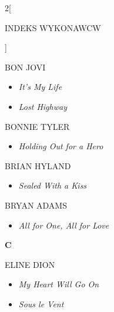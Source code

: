 \documentclass[a4paper]{report}
\begin{document}
\begin{multicols*}{2}[\begin{Huge}INDEKS WYKONAWCW\end{Huge}\vspace{1cm}]
\begin{minipage}{\columnwidth}
	BON JOVI 
	\begin{itemize}[topsep=3pt, after=\vspace{3mm}]
		\itemsep0em
		\item[]\textit{It's My Life}  \\
		\item[]  \textit{Lost Highway}  \\
	\end{itemize}
\end{minipage}
\begin{minipage}{\columnwidth}
	BONNIE TYLER 
	\begin{itemize}[topsep=3pt, after=\vspace{3mm}]
		\itemsep0em
		\item[]\textit{Holding Out for a Hero}  \\
	\end{itemize}
\end{minipage}
\begin{minipage}{\columnwidth}
	BRIAN HYLAND 
	\begin{itemize}[topsep=3pt, after=\vspace{3mm}]
		\itemsep0em
		\item[]\textit{Sealed With a Kiss}  \\
	\end{itemize}
\end{minipage}
\begin{minipage}{\columnwidth}
	BRYAN ADAMS 
	\begin{itemize}[topsep=3pt, after=\vspace{3mm}]
		\itemsep0em
		\item[]\textit{All for One, All for Love}  \\
	\end{itemize}
\end{minipage}
\begin{minipage}{\columnwidth}
	\begin{Large}\textbf{C}\end{Large}ELINE DION 
	\begin{itemize}[topsep=3pt, after=\vspace{3mm}]
		\itemsep0em
		\item[]\textit{My Heart Will Go On}  \\
		\item[]  \textit{Sous le Vent}  \\

\end{itemize}
\end{minipage}
\end{multicols*}
\end{document}
